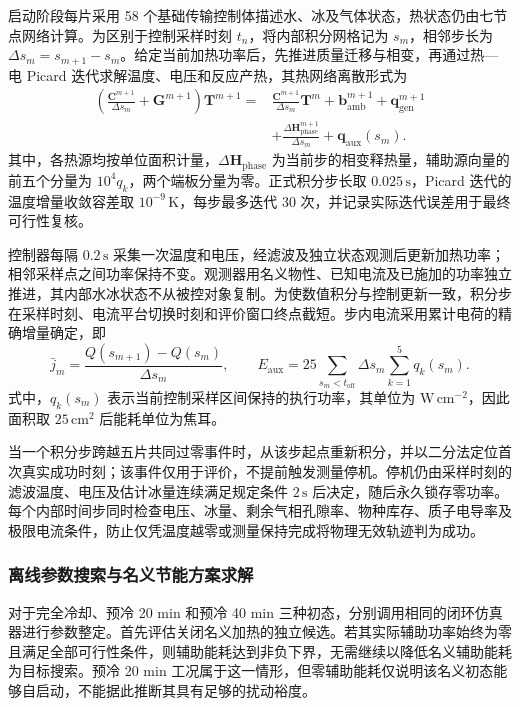 \documentclass[bwprint]{gmcmthesis}
\numberwithin{figure}{section}
\begin{document}
启动阶段每片采用 58 个基础传输控制体描述水、冰及气体状态，热状态仍由七节点网络计算。为区别于控制采样时刻 \(t_n\)，将内部积分网格记为 \(s_m\)，相邻步长为 \(\Delta s_m=s_{m+1}-s_m\)。给定当前加热功率后，先推进质量迁移与相变，再通过热—电 Picard 迭代求解温度、电压和反应产热，其热网络离散形式为
\begin{equation}
\begin{aligned}
\left(\frac{\mathbf C^{m+1}}{\Delta s_m}+\mathbf G^{m+1}\right)
\boldsymbol{T}^{m+1}
={}&\frac{\mathbf C^{m+1}}{\Delta s_m}\boldsymbol{T}^{m}
+\boldsymbol b_{\mathrm{amb}}^{m+1}+\boldsymbol q_{\mathrm{gen}}^{m+1}\\
&+\frac{\Delta\boldsymbol H_{\mathrm{phase}}^{m+1}}{\Delta s_m}
+\boldsymbol q_{\mathrm{aux}}(s_m).
\end{aligned}
\tag{7-41}\label{eq:q4:solver_startup_be}
\end{equation}
其中，各热源均按单位面积计量，\(\Delta\boldsymbol H_{\mathrm{phase}}\) 为当前步的相变释热量，辅助源向量的前五个分量为 \(10^4q_k\)，两个端板分量为零。正式积分步长取 \(0.025\,\mathrm s\)，Picard 迭代的温度增量收敛容差取 \(10^{-9}\,\mathrm K\)，每步最多迭代 30 次，并记录实际迭代误差用于最终可行性复核。

控制器每隔 \(0.2\,\mathrm s\) 采集一次温度和电压，经滤波及独立状态观测后更新加热功率；相邻采样点之间功率保持不变。观测器用名义物性、已知电流及已施加的功率独立推进，其内部水冰状态不从被控对象复制。为使数值积分与控制更新一致，积分步在采样时刻、电流平台切换时刻和评价窗口终点截短。步内电流采用累计电荷的精确增量确定，即
\begin{equation}
\bar j_m=\frac{Q(s_{m+1})-Q(s_m)}{\Delta s_m},\qquad
E_{\mathrm{aux}}=25\sum_{s_m<t_{\mathrm{off}}}\Delta s_m\sum_{k=1}^{5}q_k(s_m).
\tag{7-42}\label{eq:q4:solver_charge_energy}
\end{equation}
式中，\(q_k(s_m)\) 表示当前控制采样区间保持的执行功率，其单位为 \(\mathrm{W\,cm^{-2}}\)，因此面积取 \(25\,\mathrm{cm^2}\) 后能耗单位为焦耳。

当一个积分步跨越五片共同过零事件时，从该步起点重新积分，并以二分法定位首次真实成功时刻；该事件仅用于评价，不提前触发测量停机。停机仍由采样时刻的滤波温度、电压及估计冰量连续满足规定条件 \(2\,\mathrm s\) 后决定，随后永久锁存零功率。每个内部时间步同时检查电压、冰量、剩余气相孔隙率、物种库存、质子电导率及极限电流条件，防止仅凭温度越零或测量保持完成将物理无效轨迹判为成功。

\subsubsection{离线参数搜索与名义节能方案求解}
对于完全冷却、预冷 20 min 和预冷 40 min 三种初态，分别调用相同的闭环仿真器进行参数整定。首先评估关闭名义加热的独立候选。若其实际辅助功率始终为零且满足全部可行性条件，则辅助能耗达到非负下界，无需继续以降低名义辅助能耗为目标搜索。预冷 20 min 工况属于这一情形，但零辅助能耗仅说明该名义初态能够自启动，不能据此推断其具有足够的扰动裕度。
\end{document}
